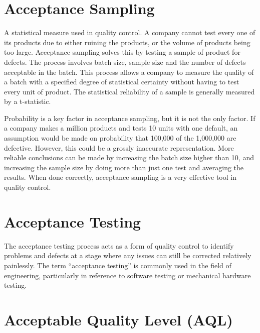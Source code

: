 \documentclass[12pts]{article}
\begin{document}
\tableofcontents


\section{Acceptance Sampling}

A statistical measure used in quality control. A company cannot test every one of its products due to either ruining the products, or the volume of products being too large. Acceptance sampling solves this by testing a sample of product for defects. The process involves batch size, sample size and the number of defects acceptable in the batch. This process allows a company to measure the quality of a batch with a specified degree of statistical certainty without having to test every unit of product. The statistical reliability of a sample is generally measured by a t-statistic.

Probability is a key factor in acceptance sampling, but it is not the only factor. If a company makes a million products and tests 10 units with one default, an assumption would be made on probability that 100,000 of the 1,000,000 are defective. However, this could be a grossly inaccurate representation. More reliable conclusions can be made by increasing the batch size higher than 10, and increasing the sample size by doing more than just one test and averaging the results. When done correctly, acceptance sampling is a very effective tool in quality control.

\section{Acceptance Testing}

The acceptance testing process acts as a form of quality control to identify problems and defects at a stage where any issues can still be corrected relatively painlessly. The term “acceptance testing” is commonly used in the field of engineering, particularly in reference to software testing or mechanical hardware testing.

\section{Acceptable Quality Level (AQL)}
\end{document}
